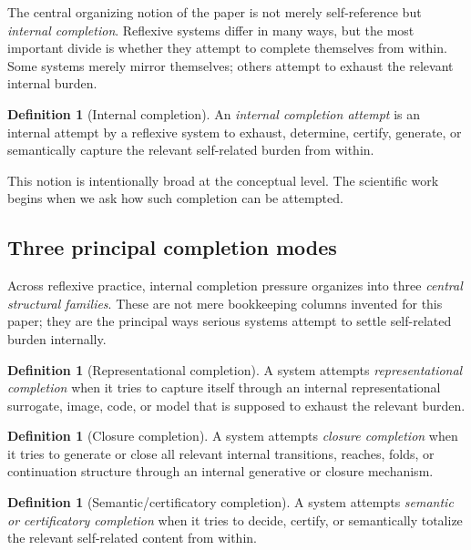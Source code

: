\documentclass[11pt]{article}
\theoremstyle{plain}
\theoremstyle{definition}
\newtheorem{definition}[theorem]{Definition}
\theoremstyle{remark}
\begin{document}
The central organizing notion of the paper is not merely self-reference but \emph{internal completion}. Reflexive systems differ in many ways, but the most important divide is whether they attempt to complete themselves from within. Some systems merely mirror themselves; others attempt to exhaust the relevant internal burden.

\begin{definition}[Internal completion]
An \emph{internal completion attempt} is an internal attempt by a reflexive system to exhaust, determine, certify, generate, or semantically capture the relevant self-related burden from within.
\end{definition}

This notion is intentionally broad at the conceptual level. The scientific work begins when we ask how such completion can be attempted.

\subsection{Three principal completion modes}

Across reflexive practice, internal completion pressure organizes into three \emph{central structural families}. These are not mere bookkeeping columns invented for this paper; they are the principal ways serious systems attempt to settle self-related burden internally.

\begin{definition}[Representational completion]
A system attempts \emph{representational completion} when it tries to capture itself through an internal representational surrogate, image, code, or model that is supposed to exhaust the relevant burden.
\end{definition}

\begin{definition}[Closure completion]
A system attempts \emph{closure completion} when it tries to generate or close all relevant internal transitions, reaches, folds, or continuation structure through an internal generative or closure mechanism.
\end{definition}

\begin{definition}[Semantic/certificatory completion]
A system attempts \emph{semantic or certificatory completion} when it tries to decide, certify, or semantically totalize the relevant self-related content from within.
\end{definition}
\end{document}
